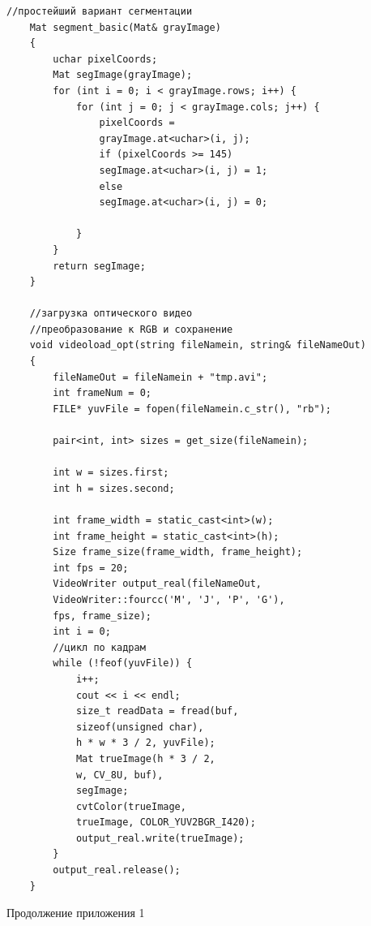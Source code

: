 \documentclass[14pt, a4paper]{extreport}
\begin{document}
\begin{Verbatim}[fontseries=c, fontsize=\fontsize{10pt}{12pt}\selectfont]
	//простейший вариант сегментации
	Mat segment_basic(Mat& grayImage)
	{
		uchar pixelCoords;
		Mat segImage(grayImage);
		for (int i = 0; i < grayImage.rows; i++) {
			for (int j = 0; j < grayImage.cols; j++) {
				pixelCoords = 
				grayImage.at<uchar>(i, j);
				if (pixelCoords >= 145)
				segImage.at<uchar>(i, j) = 1;
				else
				segImage.at<uchar>(i, j) = 0;
				
			}
		}
		return segImage;
	}
	
	//загрузка оптического видео
	//преобразование к RGB и сохранение
	void videoload_opt(string fileNamein, string& fileNameOut)
	{
		fileNameOut = fileNamein + "tmp.avi";
		int frameNum = 0;
		FILE* yuvFile = fopen(fileNamein.c_str(), "rb");
		
		pair<int, int> sizes = get_size(fileNamein);
		
		int w = sizes.first;
		int h = sizes.second;
		
		int frame_width = static_cast<int>(w);
		int frame_height = static_cast<int>(h);
		Size frame_size(frame_width, frame_height);
		int fps = 20;
		VideoWriter output_real(fileNameOut, 
		VideoWriter::fourcc('M', 'J', 'P', 'G'),
		fps, frame_size);
		int i = 0;
		//цикл по кадрам
		while (!feof(yuvFile)) {
			i++;
			cout << i << endl;
			size_t readData = fread(buf,
			sizeof(unsigned char),
			h * w * 3 / 2, yuvFile);
			Mat trueImage(h * 3 / 2,
			w, CV_8U, buf),
			segImage;
			cvtColor(trueImage,
			trueImage, COLOR_YUV2BGR_I420);
			output_real.write(trueImage);
		}
		output_real.release();
	}
\end{Verbatim}
\begin{flushright} \noindent Продолжение приложения 1 \end{flushright}
\end{document}
